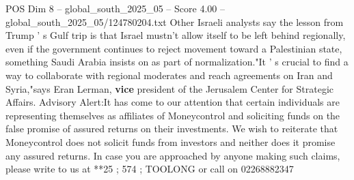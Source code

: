 \begin{textsample}{POS Dim 8 – global\_south\_2025\_05 – Score 4.00 – global\_south\_2025\_05/124780204.txt}
Other Israeli analysts say the lesson from Trump ' s Gulf trip is that Israel mustn't allow itself to be left behind regionally, even if the government continues to reject movement toward a Palestinian state, something Saudi Arabia insists on as part of normalization."It ' s crucial to find a way to collaborate with regional moderates and reach agreements on Iran and Syria,"says Eran Lerman, \textbf{vice} president of the Jerusalem Center for Strategic Affairs.
Advisory Alert:It has come to our attention that certain individuals are representing themselves as affiliates of Moneycontrol and soliciting funds on the false promise of assured returns on their investments.
We wish to reiterate that Moneycontrol does not solicit funds from investors and neither does it promise any assured returns.
In case you are approached by anyone making such claims, please write to us at **25 ; 574 ; TOOLONG or call on 02268882347

\end{textsample}
